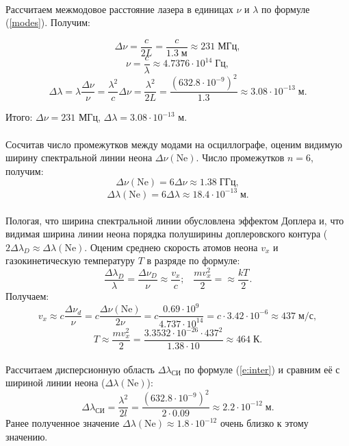 \documentclass[a4paper,12pt]{article} %
\begin{document}
\paragraph{} Рассчитаем межмодовое расстояние лазера в единицах $\nu$ и $\lambda$ по формуле (\ref{modes}). Получим:

\[
\Delta \nu = \frac{c}{2L} = \frac{c}{1.3 \; \text{м}} \approx 231 \; \text{МГц}, 
\]\[
\nu = \frac{c}{\lambda} \approx 4.7376 \cdot 10^14 \; \text{Гц},
\]\[
\Delta \lambda = \lambda \frac{\Delta \nu}{\nu} = \frac{\lambda^2}{c} \Delta \nu = \frac{\lambda^2}{2 L} = \frac{(632.8 \cdot 10^{-9})^2}{1.3} \approx 3.08 \cdot 10^{-13} \; \text{м}.
\]

\noindent Итого: $\Delta \nu = 231$ МГц, $\Delta \lambda = 3.08 \cdot 10^{-13}$ м.

\paragraph{} Сосчитав число промежутков между модами на осциллографе, оценим видимую ширину спектральной линии неона $\Delta \nu (\text{Ne})$. Число промежутков $n = 6$, получим:
\[
\Delta \nu (\text{Ne}) = 6 \Delta \nu \approx 1.38 \; \text{ГГц},
\]\[
\Delta \lambda (\text{Ne}) = 6 \Delta \lambda \approx 18.4 \cdot 10^{-13} \; \text{м}.
\]

\paragraph{} Пологая, что ширина спектральной линии обусловлена эффектом Доплера и, что видимая ширина линии неона порядка полуширины доплеровского контура ($2 \Delta \lambda_D \approx \Delta \lambda (\text{Ne})$. Оценим среднею скорость атомов неона $v_x$ и газокинетическую температуру $T$ в разряде по формуле:
\begin{equation}
\frac{\Delta \lambda_D}{\lambda} = \frac{\Delta \nu_D}{\nu} \approx \frac{v_x}{c}; \;\;\;
\frac{mv_x^2}{2} = \approx \frac{kT}{2}.
\end{equation}
Получаем:
\[v_x \approx c \frac{\Delta \nu_d}{\nu} = c \frac{\Delta \nu (\text{Ne})}{2\nu} = c \frac{0.69 \cdot 10^9}{4.737 \cdot 10^{14}} = c \cdot 3.42 \cdot 10^{-6} \approx 437 \; \text{м/с},
\]\[
T \approx \frac{mv_x^2}{2} = \frac{3.3532 \cdot 10^{-26} \cdot 437^2}{1.38 \cdot 10} \approx 464 \; \text{К}.
\]

\paragraph{} Рассчитаем дисперсионную область $\Delta \lambda_\text{СИ}$ по формуле (\ref{e:inter}) и сравним её с шириной линии неона ($\Delta \lambda (\text{Ne})$):
\[
\Delta \lambda_\text{СИ} = \frac{\lambda^2}{2l} = \frac{(632.8 \cdot 10^{-9})^2}{2 \cdot 0.09} \approx 2.2 \cdot 10^{-12} \; \text{м}.
\]
\noindent Ранее полученное значение $\Delta \lambda (\text{Ne}) \approx 1.8 \cdot 10^{-12}$ очень близко к этому значению.
\end{document}
